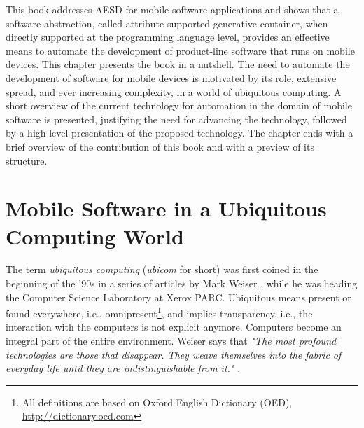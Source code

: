 This book addresses AESD for mobile software applications and shows that a software abstraction, called attribute-supported generative container, when directly supported at the programming language level, provides an effective means to automate the development of product-line software that runs on mobile devices.
This chapter presents the book in a nutshell. The need to automate the development of software for mobile devices is motivated by its role, extensive spread, and ever increasing complexity, in a world of ubiquitous computing. A short overview of the current technology for automation in the domain of mobile software is presented, justifying the need for advancing the technology, followed by a high-level presentation of the proposed technology. The chapter ends with a brief overview of the contribution of this book and with a preview of its structure.


\section{Mobile Software in a Ubiquitous Computing World}

The term \textit{ubiquitous computing} (\textit{ubicom} for short) was first coined in the beginning of the '90s in a series of articles by Mark Weiser \cite{Weiser.01,Weiser.02,Weiser.03}, while he was heading the Computer Science Laboratory at Xerox PARC. Ubiquitous means present or found everywhere, i.e., omnipresent\footnote{All definitions are based on Oxford English Dictionary (OED), \url{http://dictionary.oed.com}}, and implies transparency, i.e., the interaction with the computers is not explicit anymore. Computers become an integral part of the entire environment. Weiser says that \textit{"The most profound technologies are those that disappear. They weave themselves into the fabric of everyday life until they are indistinguishable from it."} \cite{Weiser.01}.

